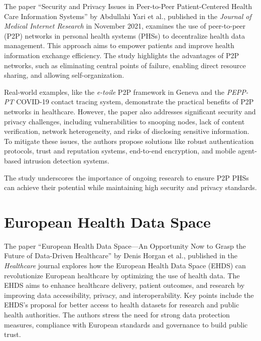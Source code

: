 The paper ``Security and Privacy Issues in Peer-to-Peer Patient-Centered Health Care Information Systems'' by Abdullahi Yari et al., published in the \textit{Journal of Medical Internet Research} in November 2021, examines the use of peer-to-peer (P2P) networks in personal health systems (PHSs) to decentralize health data management\cite{security_engineering_p2p_environments}.
This approach aims to empower patients and improve health information exchange efficiency.
The study highlights the advantages of P2P networks, such as eliminating central points of failure, enabling direct resource sharing, and allowing self-organization.

Real-world examples, like the \textit{e-toile} P2P framework in Geneva and the \textit{PEPP-PT} COVID-19 contact tracing system, demonstrate the practical benefits of P2P networks in healthcare.
However, the paper also addresses significant security and privacy challenges, including vulnerabilities to snooping nodes, lack of content verification, network heterogeneity, and risks of disclosing sensitive information.
To mitigate these issues, the authors propose solutions like robust authentication protocols, trust and reputation systems, end-to-end encryption, and mobile agent-based intrusion detection systems.%

The study underscores the importance of ongoing research to ensure P2P PHSs can achieve their potential while maintaining high security and privacy standards.

\section{European Health Data Space}\label{sec:european-health-data-spac}

The paper ``European Health Data Space—An Opportunity Now to Grasp the Future of Data-Driven Healthcare'' by Denis Horgan et al., published in the \textit{Healthcare} journal explores how the European Health Data Space (EHDS) can revolutionize European healthcare by optimizing the use of health data\cite{european_health_data_space}.
The EHDS aims to enhance healthcare delivery, patient outcomes, and research by improving data accessibility, privacy, and interoperability.
Key points include the EHDS's proposal for better access to health datasets for research and public health authorities.
The authors stress the need for strong data protection measures, compliance with European standards and governance to build public trust.

